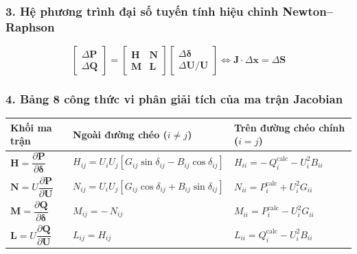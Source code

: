 \documentclass[10.5pt,a4paper]{article}
\begin{document}
\subsubsection*{3. Hệ phương trình đại số tuyến tính hiệu chỉnh Newton--Raphson}
\vspace{-4pt}
\begin{equation}
\begin{bmatrix}
\Delta \mathbf{P} \\
\Delta \mathbf{Q}
\end{bmatrix}
=
\begin{bmatrix}
\mathbf{H} & \mathbf{N} \\
\mathbf{M} & \mathbf{L}
\end{bmatrix}
\begin{bmatrix}
\Delta \boldsymbol{\delta} \\
\Delta \mathbf{U} / \mathbf{U}
\end{bmatrix}
\iff \mathbf{J} \cdot \Delta \mathbf{x} = \Delta \mathbf{S}
\end{equation}

\vspace{-6pt}
\subsubsection*{4. Bảng 8 công thức vi phân giải tích của ma trận Jacobian}
\vspace{-4pt}
\begin{table}[H]
\centering
\small
\begin{tabular}{lll}
\toprule
\textbf{Khối ma trận} & \textbf{Ngoài đường chéo ($i \ne j$)} & \textbf{Trên đường chéo chính ($i = j$)} \\
\midrule
$\mathbf{H} = \dfrac{\partial \mathbf{P}}{\partial \boldsymbol{\delta}}$ & $H_{ij} = U_i U_j [G_{ij} \sin\delta_{ij} - B_{ij} \cos\delta_{ij}]$ & $H_{ii} = -\, Q_i^{\text{calc}} - U_i^2 B_{ii}$ \\[6pt]
$\mathbf{N} = U \dfrac{\partial \mathbf{P}}{\partial \mathbf{U}}$ & $N_{ij} = U_i U_j [G_{ij} \cos\delta_{ij} + B_{ij} \sin\delta_{ij}]$ & $N_{ii} = P_i^{\text{calc}} + U_i^2 G_{ii}$ \\[6pt]
$\mathbf{M} = \dfrac{\partial \mathbf{Q}}{\partial \boldsymbol{\delta}}$ & $M_{ij} = -\, N_{ij}$ & $M_{ii} = P_i^{\text{calc}} - U_i^2 G_{ii}$ \\[6pt]
$\mathbf{L} = U \dfrac{\partial \mathbf{Q}}{\partial \mathbf{U}}$ & $L_{ij} = H_{ij}$ & $L_{ii} = Q_i^{\text{calc}} - U_i^2 B_{ii}$ \\
\bottomrule
\end{tabular}
\end{table}
\end{document}
